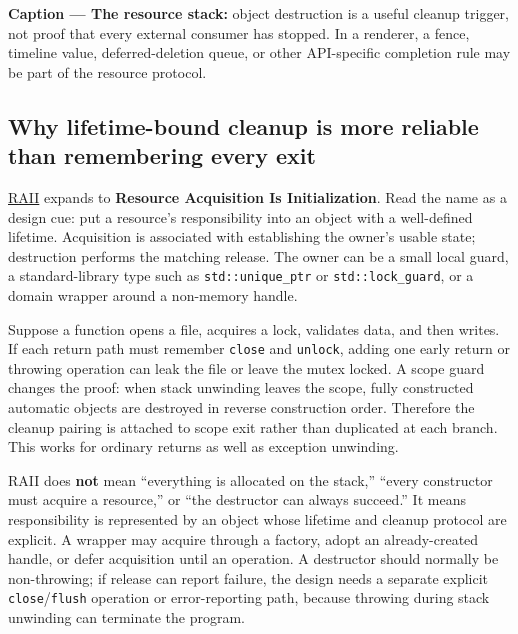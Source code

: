 \textbf{Caption --- The resource stack:} object destruction is a useful cleanup trigger, not proof that every external consumer has stopped. In a renderer, a fence, timeline value, deferred-deletion queue, or other API-specific completion rule may be part of the resource protocol.

\subsection{Why lifetime-bound cleanup is more reliable than remembering every exit}\label{05-engine-i-ch004-why-lifetime-bound-cleanup-is-more-reliable-than-remembering-every-exit}

\hypertarget{05-engine-i-ch004-why-lifetime-bound-cleanup-is-more-reliable-than-remembering-every-exit}{}

\hyperref[appendix-69739d3ab49b]{RAII} expands to \textbf{Resource Acquisition Is Initialization}. Read the name as a design cue: put a resource's responsibility into an object with a well-defined lifetime. Acquisition is associated with establishing the owner's usable state; destruction performs the matching release. The owner can be a small local guard, a standard-library type such as \texttt{std::unique\_ptr} or \texttt{std::lock\_guard}, or a domain wrapper around a non-memory handle.

Suppose a function opens a file, acquires a lock, validates data, and then writes. If each return path must remember \texttt{close} and \texttt{unlock}, adding one early return or throwing operation can leak the file or leave the mutex locked. A scope guard changes the proof: when stack unwinding leaves the scope, fully constructed automatic objects are destroyed in reverse construction order. Therefore the cleanup pairing is attached to scope exit rather than duplicated at each branch. This works for ordinary returns as well as exception unwinding.

RAII does \textbf{not} mean ``everything is allocated on the stack,'' ``every constructor must acquire a resource,'' or ``the destructor can always succeed.'' It means responsibility is represented by an object whose lifetime and cleanup protocol are explicit. A wrapper may acquire through a factory, adopt an already-created handle, or defer acquisition until an operation. A destructor should normally be non-throwing; if release can report failure, the design needs a separate explicit \texttt{close}/\texttt{flush} operation or error-reporting path, because throwing during stack unwinding can terminate the program.

